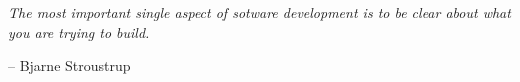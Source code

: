 \epigraph{\textit{The most important single aspect of sotware development is to be clear about what you are trying to build.}}{-- \textup{Bjarne Stroustrup}}